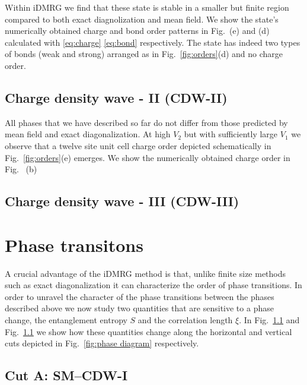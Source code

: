 \documentclass[aps,prx,10pt,twocolumn,floatfix,superscriptaddress,showpacs,numerical,footinbib]{revtex4-1}
\begin{document}
Within iDMRG we find that these state is stable in a smaller but finite region compared to both 
exact diagnolization and mean field.
%
We show the state's numerically obtained charge and bond order patterns in Fig.~\cite{fig:phase diagram}(e) and (d) 
calculated with \eqref{eq:charge} \eqref{eq:bond} respectively.
%
The state has indeed two types of bonds (weak and strong) arranged as in Fig.~\ref{fig:orders}(d) 
and no charge order.
%



\subsection{Charge density wave - II (CDW-II)}
%
All phases that we have described so far do not differ
from those predicted by mean field and exact diagonalization.
%
At high $V_{2}$ but with sufficiently large $V_{1}$ we observe that
a twelve site unit cell charge order depicted schematically in 
Fig.~\ref{fig:orders}(e) emerges.
%
We show the numerically obtained charge order in 
Fig.~\cite{fig:phase diagram} (b)
%


\subsection{Charge density wave - III (CDW-III)}
%



\section{\label{sec:phasetransitions} Phase transitons}
%
A crucial advantage of the iDMRG method is that, unlike finite
size methods such as exact diagonalization it can characterize the order of phase transitions.
%
In order to unravel the character of the phase transitions between
the phases described above we now study two quantities that are sensitive
to a phase change, the entanglement entropy $S$ and the correlation length $\xi$.
%
In Fig.~\ref{}  and Fig.~\ref{} we show how these quantities change along
the horizontal and vertical cuts depicted in Fig.~\ref{fig:phase diagram} respectively.
%

\subsection{Cut A: SM--CDW-I}
\end{document}
